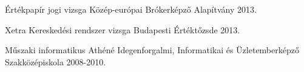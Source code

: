 \begin{cventries}
  \cventry
    {Értékpapír jogi vizsga} %
    {Közép-európai Brókerképző Alapítvány} %
    {} %
    {2013.} %
    {
    }
    \vspace{-2.0mm}
    
  \cventry
    {Xetra Kereskedési rendszer vizsga} %
    {Budapesti Értéktőzsde} %
    {} %
    {2013.} %
    {
    }
    \vspace{-2.0mm}

  \cventry
    {Műszaki informatikus} %
    {Athéné Idegenforgalmi, Informatikai és Üzletemberképző Szakközépiskola} %
    {} %
    {2008-2010.} %
    {
    }

\end{cventries}
